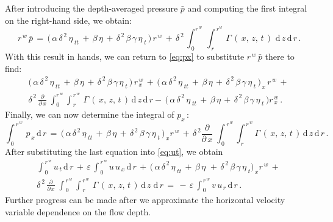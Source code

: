 \documentclass[alpha-refs, 12pt]{wiley-article}
\newcommand{\eps}{\varepsilon}
\begin{document}
After introducing the depth-averaged pressure $\bar{p}$ and computing the first integral on the right-hand side, we obtain:
\begin{equation*}
  \,r^{\,w}\,\bar{p}\,=\,\bigl(\,\alpha\,\delta^{\,2}\,\eta_{\;tt}\, + \,\beta\,\eta\, + \,\delta^{\,2}\,\beta\,\gamma\,\eta_{\;t}\,\bigr)\,r^{\,w}\,+
    \,\delta^{\,2}\,\displaystyle \int_{\,0}^{r^{\,w}}\,\displaystyle \int_{\,r}^{\,r^{w}}\,\Gamma\,(\,x,\,z,\,t\,)\,\,\mathrm{d}\,z\,\mathrm{d}\,r\,.
\end{equation*}
With this result in hands, we can return to \cref{eq:px} to substitute $r^{\,w}\,\bar{p}$ there to find:
\begin{multline*}
  \bigl(\,\alpha\,\delta^{\,2}\,\eta_{\;tt}\, + \,\beta\,\eta\,+\,\delta^{\,2}\,\beta\,\gamma\,\eta_{\;t}\,\bigr)\,r^{\,w}_{\,x}\, + \,\bigl(\,\alpha\, \delta^{\,2}\,\eta_{\;tt}\, + \,\beta\,\eta\,+\,\delta^{\,2}\, \beta\,\gamma\,\eta_{\;t}\,\bigr)_{\,x}\,r^{\,w}\, + \\
  \delta^{\,2}\,\frac{\partial}{\partial\,x}\;\int_{0}^{r^{\,w}} \int_{\,r}^{\,r^{\,w}}\,\Gamma\,(\,x,\,z,\,t\,)\,\mathrm{d}\,z\,\mathrm{d}\,r - \,\bigl(\,\alpha\, \delta^{\,2}\,\eta_{\;tt}\, + \,\beta\,\eta\, + \,\delta^{\,2}\,\beta\,\gamma\,\eta_{\;t}\,\bigr)r^{\,w}_{\,x}\,.
\end{multline*}
Finally, we can now determine the integral of $p_x\,$:
\begin{equation*}
  \int_{\,0}^{\,r^{\,w}}\,p_{\,x}\,\mathrm{d}\,r\,=\, \bigl(\,\alpha\,\delta^{\,2}\,\eta_{\;tt}\, + \,\beta\, \eta\,+\,\delta^{\,2}\,\beta\,\gamma\,\eta_{\;t}\,\bigr)_{\,x}r^{\,w}\, +
    \,\delta^{\,2}\frac{\partial}{\partial\,x}\; \int_{\,0}^{\,r^{\,w}} \int_{\,r}^{\,r^{\,w}}\Gamma\,(\,x,\,z,\,t\,)\,\mathrm{d}\,z\,\mathrm{d}\,r\,.
\end{equation*}
After substituting the last equation into \cref{eq:ut}, we obtain
\begin{multline*}
  \int_{\,0}^{\,r^{\,w}}u_{\,t}\,\mathrm{d}\,r\,+\,\eps\, \int_{\,0}^{\,r^{\,w}}u\,u_{\,x}\,\mathrm{d}\,r\,+\,\bigl(\,\alpha\, \delta^{\,2}\,\eta_{\;tt}\,+\,\beta\,\eta\,\,+\,\delta^{\,2}\,\beta\,\gamma\,\eta_{\;t}\bigr)_{\,x}r^{\,w}\, + \\
  \delta^{\,2}\,\frac{\partial}{\partial\,x}\; \int_{\,0}^{\,r^{\,w}} \int_{\,r}^{\,r^{\,w}}\,\Gamma\,(\,x,\,z,\,t\,)\,\mathrm{d}\,z\;\mathrm{d}\,r\,=\,-\,\eps\,\int_{\,0}^{\,r^{\,w}}v\, u_{\,r}\,\mathrm{d}\,r\,.
\end{multline*}
Further progress can be made after we approximate the horizontal velocity variable dependence on the flow depth.
\end{document}
